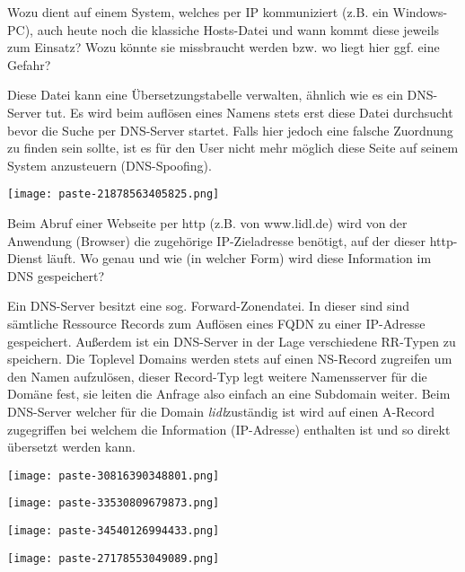 \documentclass{article}
\begin{document}
\begin{tcolorbox}[colback=white!10!white,colframe=lightgray!75!black,
  savelowerto=\jobname_ex.tex,breakable,enhanced,lines before break=40]

\justifying
Wozu dient auf einem System, welches per IP kommuniziert (z.B. ein Windows-PC), auch heute noch die klassiche Hosts-Datei und wann kommt diese jeweils zum Einsatz? Wozu könnte sie missbraucht werden bzw. wo liegt hier ggf. eine Gefahr?

\tcblower

\justifying
Diese Datei kann eine Übersetzungstabelle verwalten, ähnlich wie es ein DNS-Server tut. Es wird beim auflösen eines Namens stets erst diese Datei durchsucht bevor die Suche per DNS-Server startet. Falls hier jedoch eine falsche Zuordnung zu finden sein sollte, ist es für den User nicht mehr möglich diese Seite auf seinem System anzusteuern (DNS-Spoofing).\begin{center}
\texttt{[image: paste-21878563405825.png]}
\end{center}

\end{tcolorbox}
\begin{tcolorbox}[colback=white!10!white,colframe=lightgray!75!black,
  savelowerto=\jobname_ex.tex,breakable,enhanced,lines before break=40]

\justifying
Beim Abruf einer Webseite per http (z.B. von www.lidl.de) wird von der Anwendung (Browser) die zugehörige IP-Zieladresse benötigt, auf der dieser http-Dienst läuft. Wo genau und wie (in welcher Form) wird diese Information im DNS gespeichert?

\tcblower

\justifying
Ein DNS-Server besitzt eine sog. Forward-Zonendatei. In dieser sind sind sämtliche Ressource Records zum Auflösen eines FQDN zu einer IP-Adresse gespeichert. Außerdem ist ein DNS-Server in der Lage verschiedene RR-Typen zu speichern. Die Toplevel Domains werden stets auf einen NS-Record zugreifen um den Namen aufzulösen, dieser Record-Typ legt weitere Namensserver für die Domäne fest, sie leiten die Anfrage also einfach an eine Subdomain weiter. Beim DNS-Server welcher für die Domain \textit{lidl}zuständig ist wird auf einen A-Record zugegriffen bei welchem die Information (IP-Adresse) enthalten ist und so direkt übersetzt werden kann.\begin{center}
\texttt{[image: paste-30816390348801.png]}
\end{center}
\begin{center}
\texttt{[image: paste-33530809679873.png]}
\end{center}
\begin{center}
\texttt{[image: paste-34540126994433.png]}
\end{center}
\begin{center}
\texttt{[image: paste-27178553049089.png]}
\end{center}

\end{tcolorbox}
\end{document}
